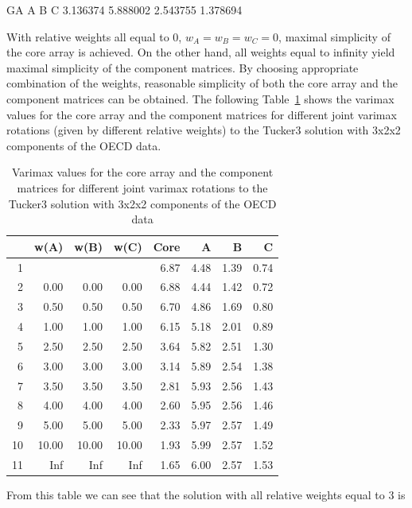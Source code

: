 \documentclass[article,shortnames, nojss]{jss}
\begin{document}
\begin{Schunk}
\begin{Soutput}
      GA        A        B        C 
3.136374 5.888002 2.543755 1.378694 
\end{Soutput}
\end{Schunk}

With relative weights all equal to 0, $w_A=w_B=w_C=0$,
maximal simplicity of the core array is achieved. On the other hand,
all weights equal to infinity yield maximal simplicity of the component matrices.
By choosing appropriate combination of the weights, reasonable simplicity of
both the core array and the component matrices can be obtained. The following
Table~\ref{tab:varimax} shows the varimax values for the core array and
the component matrices for different joint varimax rotations (given by different
relative weights) to the Tucker3 solution with 3x2x2 components of the OECD data.
\begin{table}[H]
\centering
\begin{tabular}{rrrrrrrr}
  \hline
 & w(A) & w(B) & w(C) & Core & A & B & C \\ 
  \hline
1 &  &  &  & 6.87 & 4.48 & 1.39 & 0.74 \\ 
  2 & 0.00 & 0.00 & 0.00 & 6.88 & 4.44 & 1.42 & 0.72 \\ 
  3 & 0.50 & 0.50 & 0.50 & 6.70 & 4.86 & 1.69 & 0.80 \\ 
  4 & 1.00 & 1.00 & 1.00 & 6.15 & 5.18 & 2.01 & 0.89 \\ 
  5 & 2.50 & 2.50 & 2.50 & 3.64 & 5.82 & 2.51 & 1.30 \\ 
  6 & 3.00 & 3.00 & 3.00 & 3.14 & 5.89 & 2.54 & 1.38 \\ 
  7 & 3.50 & 3.50 & 3.50 & 2.81 & 5.93 & 2.56 & 1.43 \\ 
  8 & 4.00 & 4.00 & 4.00 & 2.60 & 5.95 & 2.56 & 1.46 \\ 
  9 & 5.00 & 5.00 & 5.00 & 2.33 & 5.97 & 2.57 & 1.49 \\ 
  10 & 10.00 & 10.00 & 10.00 & 1.93 & 5.99 & 2.57 & 1.52 \\ 
  11 & Inf & Inf & Inf & 1.65 & 6.00 & 2.57 & 1.53 \\ 
   \hline
\end{tabular}
\caption{Varimax values for
the core array and the component matrices for different joint
varimax rotations to the Tucker3 solution with 3x2x2 components
of the OECD data} 
\label{tab:varimax}
\end{table}From this table we can see that the solution with all relative weights equal to 3 is
\end{document}
